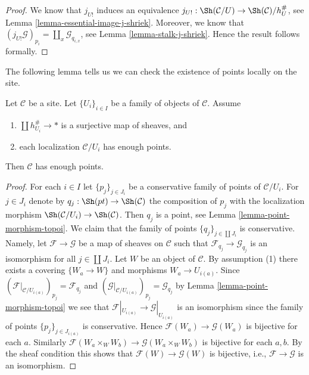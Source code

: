 \begin{proof}
We know that $j_{U!}$ induces an equivalence
$j_{U!} : \Sh(\mathcal{C}/U) \to \Sh(\mathcal{C})/h_U^\#$, see
Lemma \ref{lemma-essential-image-j-shriek}.
Moreover, we know that
$(j_{U!}\mathcal{G})_{p_i} = \coprod_x \mathcal{G}_{q_{i, x}}$, see
Lemma \ref{lemma-stalk-j-shriek}.
Hence the result follows formally.
\end{proof}

\noindent
The following lemma tells us we can check the existence of points
locally on the site.

\begin{lemma}
\label{lemma-enough-points-local}
Let $\mathcal{C}$ be a site. Let $\{U_i\}_{i \in I}$ be a family of
objects of $\mathcal{C}$. Assume
\begin{enumerate}
\item $\coprod h_{U_i}^\# \to *$ is a surjective map of sheaves, and
\item each localization $\mathcal{C}/U_i$ has enough points.
\end{enumerate}
Then $\mathcal{C}$ has enough points.
\end{lemma}

\begin{proof}
For each $i \in I$ let $\{p_j\}_{j \in J_i}$ be a conservative
family of points of $\mathcal{C}/U_i$. For $j \in J_i$ denote by
$q_j : \Sh(pt) \to \Sh(\mathcal{C})$ the composition
of $p_j$ with the localization morphism
$\Sh(\mathcal{C}/U_i) \to \Sh(\mathcal{C})$.
Then $q_j$ is a point, see
Lemma \ref{lemma-point-morphism-topoi}.
We claim that the family of points $\{q_j\}_{j \in \coprod J_i}$
is conservative.
Namely, let $\mathcal{F} \to \mathcal{G}$ be a map of sheaves
on $\mathcal{C}$ such that $\mathcal{F}_{q_j} \to \mathcal{G}_{q_j}$
is an isomorphism for all $j \in \coprod J_i$.
Let $W$ be an object of $\mathcal{C}$.
By assumption (1) there exists a covering $\{W_a \to W\}$ and
morphisms $W_a \to U_{i(a)}$.
Since $(\mathcal{F}|_{\mathcal{C}/U_{i(a)}})_{p_j} = \mathcal{F}_{q_j}$
and $(\mathcal{G}|_{\mathcal{C}/U_{i(a)}})_{p_j} = \mathcal{G}_{q_j}$ by
Lemma \ref{lemma-point-morphism-topoi}
we see that
$\mathcal{F}|_{U_{i(a)}} \to \mathcal{G}|_{U_{i(a)}}$ is an isomorphism
since the family of points $\{p_j\}_{j \in J_{i(a)}}$ is conservative.
Hence $\mathcal{F}(W_a) \to \mathcal{G}(W_a)$ is bijective for each $a$.
Similarly $\mathcal{F}(W_a \times_W W_b) \to \mathcal{G}(W_a \times_W W_b)$
is bijective for each $a, b$.
By the sheaf condition this shows that
$\mathcal{F}(W) \to \mathcal{G}(W)$ is bijective, i.e.,
$\mathcal{F} \to \mathcal{G}$ is an isomorphism.
\end{proof}

